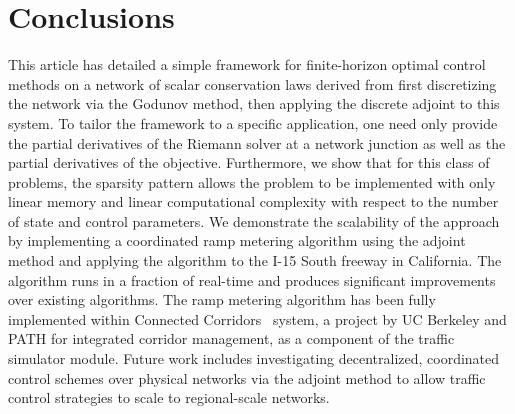 \section{Conclusions\label{sec:Conclusions}}

This article has detailed a simple framework for finite-horizon optimal control 
methods on a network of scalar conservation laws derived from first 
discretizing the network via the Godunov method, then applying the discrete 
adjoint to this system. To tailor the framework to a specific application, one 
need only provide the partial derivatives of the Riemann solver at a network 
junction as well as the partial derivatives of the objective. Furthermore, we 
show that for this class of problems, the sparsity pattern allows the problem 
to be implemented with only linear memory and linear computational complexity 
with respect to the number of state and control parameters. We demonstrate the 
scalability of the approach by implementing a coordinated ramp metering 
algorithm using the adjoint method and applying the algorithm to the I-15 South 
freeway in California. The algorithm runs in a fraction of real-time 
and produces significant improvements over existing algorithms. The ramp 
metering algorithm has been fully implemented within Connected 
Corridors~\cite{CC} system, a project by UC Berkeley and PATH for integrated 
corridor management, as a component of the traffic simulator module. Future 
work includes investigating decentralized, coordinated control schemes over physical 
networks via the adjoint method to allow traffic control strategies to scale to 
regional-scale networks.
